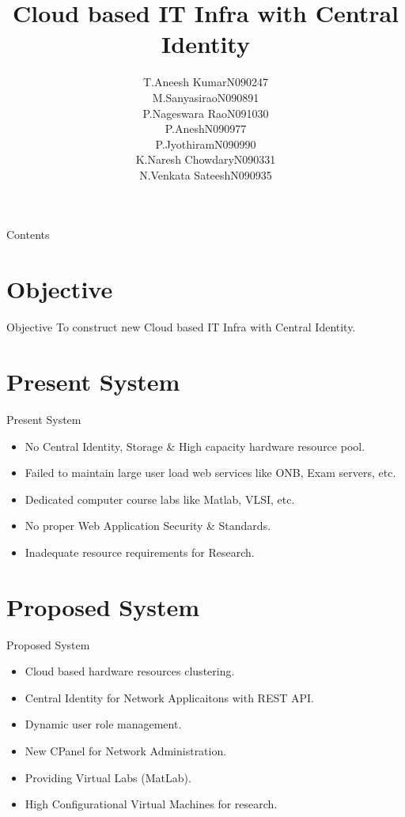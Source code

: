 \documentclass[xcolor=dvipsnames]{beamer}
\title[Cloud based IT Infra with Central Identity]{Cloud based IT Infra with Central Identity}
\author{T.Aneesh Kumar\hspace{9mm}N090247\\M.Sanyasirao\hspace{15mm}N090891\\P.Nageswara Rao\hspace{8mm}N091030\\P.Anesh\hspace{23mm}N090977\\P.Jyothiram\hspace{17mm}N090990\\K.Naresh Chowdary\hspace{4mm}N090331\\N.Venkata Sateesh\hspace{5mm}N090935}
\institute{Dept. of CSE, RGUKT - Nuzvid}
\begin{document}
\begin{frame}
\titlepage
\end{frame}

\begin{frame}{Contents}
\tableofcontents
\end{frame}




\section{Objective}
\begin{frame}{Objective}
To construct new Cloud based IT Infra with Central Identity.
\end{frame}

\section{Present System}
\begin{frame}{Present System}

\begin{itemize}
	\item No Central Identity, Storage \& High capacity hardware resource pool.
	\item Failed to maintain large user load web services like ONB, Exam servers, etc.
	\item Dedicated computer course labs like Matlab, VLSI, etc.
	\item No proper Web Application Security \& Standards.
	\item Inadequate resource requirements for Research.
\end{itemize}

\end{frame}



\section{Proposed System}
\begin{frame}{Proposed System}
\begin{itemize}
	\item Cloud based hardware resources clustering.
	\item Central Identity for Network Applicaitons with REST API.
	\item Dynamic user role management.
	\item New CPanel for Network Administration.
	\item Providing Virtual Labs (MatLab).
	\item High Configurational Virtual Machines for research.
\end{itemize}
\end{frame}
\end{document}
